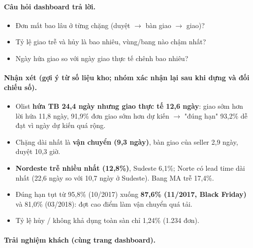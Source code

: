 \paragraph{Câu hỏi dashboard trả lời.}

\begin{itemize}
  \item Đơn mất bao lâu ở từng chặng (duyệt $\rightarrow$ bàn giao $\rightarrow$ giao)?
  \item Tỷ lệ giao trễ và hủy là bao nhiêu, vùng/bang nào chậm nhất?
  \item Ngày hứa giao so với ngày giao thực tế chênh bao nhiêu?
\end{itemize}



\paragraph{Nhận xét (gợi ý từ số liệu kho; \textbf{nhóm xác nhận lại sau khi dựng và đối chiếu số}).}

\begin{itemize}
  \item Olist \textbf{hứa TB 24,4 ngày nhưng giao thực tế 12,6 ngày}: giao sớm hơn lời hứa 11,8 ngày, 91,9\% đơn giao sớm hơn dự kiến $\rightarrow$ "đúng hạn" 93,2\% dễ đạt vì ngày dự kiến quá rộng.
  \item Chặng dài nhất là \textbf{vận chuyển (9,3 ngày)}, bàn giao của seller 2,9 ngày, duyệt 10,3 giờ.
  \item \textbf{Nordeste trễ nhiều nhất (12,8\%)}, Sudeste 6,1\%; Norte có lead time dài nhất (22,6 ngày so với 10,7 ngày ở Sudeste). Bang MA trễ 17,4\%.
  \item Đúng hạn tụt từ 95,8\% (10/2017) xuống \textbf{87,6\% (11/2017, Black Friday)} và 81,0\% (03/2018): đợt cao điểm làm vận chuyển quá tải.
  \item Tỷ lệ hủy / không khả dụng toàn sàn chỉ 1,24\% (1.234 đơn).
\end{itemize}

\paragraph{Trải nghiệm khách (cùng trang dashboard).}

